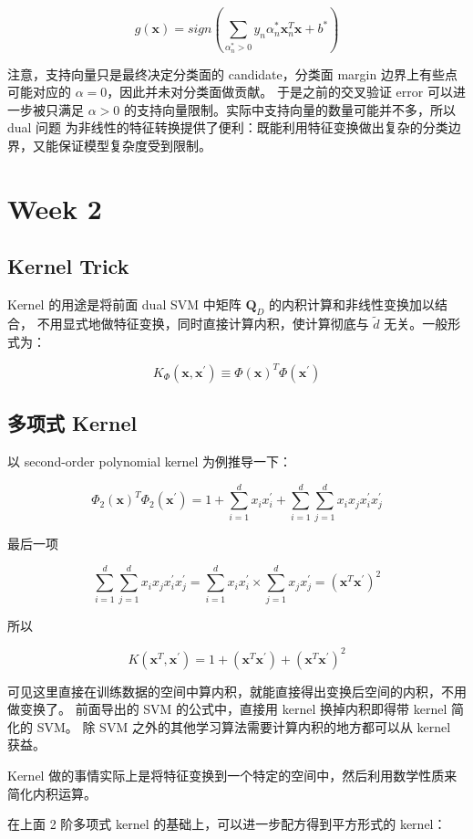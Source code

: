 \documentclass[a4paper]{article}
\begin{document}
$$g(\mathbf{x}) = sign \left ( \sum_{\alpha_n^{*} > 0} y_n \alpha_n^{*} \mathbf{x}_n^{T} \mathbf{x} + b^{*} \right )$$

注意，支持向量只是最终决定分类面的 candidate，分类面 margin 边界上有些点可能对应的 $\alpha = 0$，因此并未对分类面做贡献。
于是之前的交叉验证 error 可以进一步被只满足 $\alpha > 0$ 的支持向量限制。实际中支持向量的数量可能并不多，所以 dual 问题
为非线性的特征转换提供了便利：既能利用特征变换做出复杂的分类边界，又能保证模型复杂度受到限制。


\section{Week 2}
\subsection{Kernel Trick}
Kernel 的用途是将前面 dual SVM 中矩阵 $\mathbf{Q}_D$ 的内积计算和非线性变换加以结合，
不用显式地做特征变换，同时直接计算内积，使计算彻底与 $\tilde{d}$ 无关。一般形式为：

$$K_{\Phi}(\mathbf{x}, \mathbf{x}^{\prime}) \equiv \Phi(\mathbf{x})^T \Phi(\mathbf{x}^{\prime})$$

\subsection{多项式 Kernel}
以 second-order polynomial kernel 为例推导一下：

$$\Phi_2(\mathbf{x})^T \Phi_2(\mathbf{x}^{\prime}) = 1 + \sum_{i=1}^{d}x_ix_i^{\prime} + \sum_{i=1}^{d}\sum_{j=1}^{d}x_ix_jx_i^{\prime}x_j^{\prime}$$

最后一项

$$\sum_{i=1}^{d}\sum_{j=1}^{d}x_ix_jx_i^{\prime}x_j^{\prime} = \sum_{i=1}^{d}x_ix_i^{\prime} \times \sum_{j=1}^{d}x_jx_j^{\prime} = (\mathbf{x}^T\mathbf{x}^{\prime})^2$$

所以

$$K(\mathbf{x}^T, \mathbf{x}^{\prime}) = 1 + (\mathbf{x}^T\mathbf{x}^{\prime}) + (\mathbf{x}^T\mathbf{x}^{\prime})^2$$

可见这里直接在训练数据的空间中算内积，就能直接得出变换后空间的内积，不用做变换了。
前面导出的 SVM 的公式中，直接用 kernel 换掉内积即得带 kernel 简化的 SVM。
除 SVM 之外的其他学习算法需要计算内积的地方都可以从 kernel 获益。

Kernel 做的事情实际上是将特征变换到一个特定的空间中，然后利用数学性质来简化内积运算。

在上面 2 阶多项式 kernel 的基础上，可以进一步配方得到平方形式的 kernel：
\end{document}
